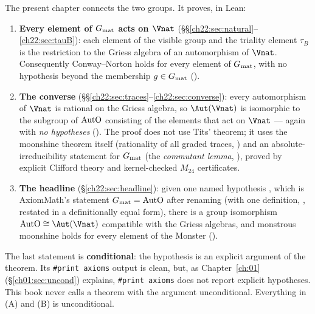 The present chapter connects the two groups.  It proves, in Lean:
\begin{enumerate}[label=(\Alph*)]
\item \textbf{Every element of $G_{\mathrm{mat}}$ acts on $\Vnat$} (\S\S\ref{ch22:sec:natural}--\ref{ch22:sec:tauB}):
  each element of the visible group and the triality element $\tau_B$ is the restriction to the Griess algebra of an
  automorphism of $\Vnat$.  Consequently Conway--Norton holds for every element of $G_{\mathrm{mat}}$, with
  no hypothesis beyond the membership $g\in G_{\mathrm{mat}}$ ().
\item \textbf{The converse} (\S\S\ref{ch22:sec:traces}--\ref{ch22:sec:converse}): every automorphism of $\Vnat$ is
  rational on the Griess algebra, so $\Aut(\Vnat)$ is isomorphic to the subgroup of $\mathrm{AutO}$ consisting of
  the elements that act on $\Vnat$ --- again with \emph{no hypotheses}
  ().  The proof does not use Tits' theorem; it uses the moonshine theorem
  itself (rationality of all graded traces, ) and an absolute-irreducibility statement for
  $G_{\mathrm{mat}}$ (the \emph{commutant lemma}, ), proved by explicit Clifford theory and
  kernel-checked $M_{24}$ certificates.
\item \textbf{The headline} (\S\ref{ch22:sec:headline}): given one named hypothesis
  , which is AxiomMath's statement $G_{\mathrm{mat}}=\mathrm{AutO}$ after renaming (with one
  definition, , restated in a definitionally equal form), there is a group isomorphism $\chtwentytwoAutO\cong\Aut(\Vnat)$ compatible with the Griess algebras, and monstrous
  moonshine holds for every element of the Monster ().
\end{enumerate}
The last statement is \textbf{conditional}: the hypothesis  is an explicit argument of the theorem.
Its \texttt{\#print axioms} output is clean, but, as Chapter~\ref{ch:01} (\S\ref{ch01:sec:uncond}) explains,
\texttt{\#print axioms} does not report explicit hypotheses.  This book never calls a theorem with the argument
 unconditional.  Everything in (A) and (B) is unconditional.

